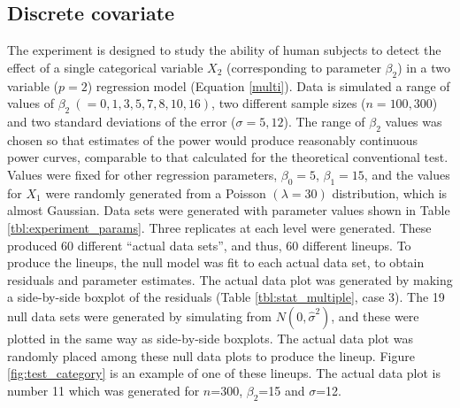 \documentclass{article}
\begin{document}
\subsection{Discrete covariate}\label{sec:category}

The experiment is designed to study the ability of human subjects to detect the effect of a single categorical variable $X_2$ (corresponding to parameter $\beta_2$) in a two variable ($p=2$) regression model (Equation \ref{multi}). Data is simulated a range of values of $\beta_2~ (=0, 1, 3, 5, 7, 8, 10, 16)$, two different sample sizes ($n=100, 300$) and two standard deviations of the error ($\sigma=5, 12$). The range of $\beta_2$ values was chosen so that estimates of the power would produce reasonably continuous power curves, comparable to that calculated for the theoretical conventional test. Values were fixed for other regression parameters, $\beta_0 = 5$,  $\beta_1=15$, and the values for $X_1$ were randomly generated from a Poisson $(\lambda=30)$ distribution, which is almost Gaussian. Data sets were generated with parameter values shown in Table \ref{tbl:experiment_params}. Three replicates at each level were generated. These produced 60 different ``actual data sets'', and thus, 60 different lineups. To produce the lineups, the null model was fit to each actual data set, to obtain residuals and parameter estimates. The actual data plot was generated by making a side-by-side boxplot of the residuals (Table \ref{tbl:stat_multiple}, case 3). The 19 null data sets were generated by simulating from  $N(0, {\hat{\sigma}}^2)$, and these were plotted in the same way as side-by-side boxplots. The actual data plot was randomly placed among these null data plots to produce the lineup. Figure \ref{fig:test_category} is an example of one of these lineups. The actual data plot is number 11 which was generated for $n$=300, $\beta_2$=15 and $\sigma$=12.  

\end{document}
